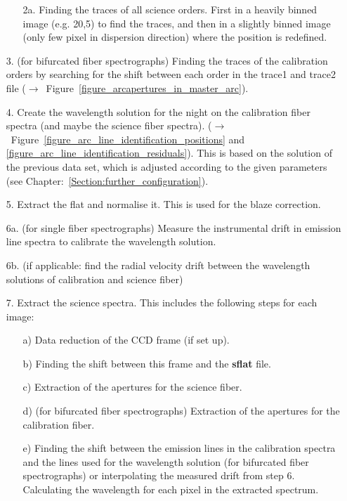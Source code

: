 \documentclass[10pt,a4paper]{article}
\begin{document}
\begin{itemize}
  \begin{itemize}
    \item[2a.] Finding the traces of all science orders. First in a heavily binned image (e.g. 20,5) to find the traces, and then in a slightly binned image (only few pixel in dispersion direction) where the position is redefined.
  \end{itemize}
  \item[3.] (for bifurcated fiber spectrographs) Finding the traces of the calibration orders by searching for the shift between each order in the trace1 and trace2 file ($\rightarrow$~Figure~\ref{figure_arcapertures_in_master_arc}). 
  \item[4.] Create the wavelength solution for the night on the calibration fiber spectra (and maybe the science fiber spectra). ($\rightarrow$~Figure~\ref{figure_arc_line_identification_positions} and \ref{figure_arc_line_identification_residuals}). This is based on the solution of the previous data set, which is adjusted according to the given parameters (see Chapter:~\ref{Section:further_configuration}).
  \item[5.] Extract the flat and normalise it. This is used for the blaze correction.
  \item[6a.] (for single fiber spectrographs) Measure the instrumental drift in emission line spectra to calibrate the wavelength solution.
  \item[6b.] (if applicable: find the radial velocity drift between the wavelength solutions of calibration and science fiber)
  \item[7.] Extract the science spectra. This includes the following steps for each image:
  \begin{itemize}
    \item[a)] Data reduction of the CCD frame (if set up).
    \item[b)] Finding the shift between this frame and the \textbf{sflat} file.
    \item[c)] Extraction of the apertures for the science fiber.
    \item[d)] (for bifurcated fiber spectrographs) Extraction of the apertures for the calibration fiber.
    \item[e)] Finding the shift between the emission lines in the calibration spectra and the lines used for the wavelength solution (for bifurcated fiber spectrographs) or interpolating the measured drift from step 6. Calculating the wavelength for each pixel in the extracted spectrum.

\end{itemize}
\end{itemize}
\end{document}
